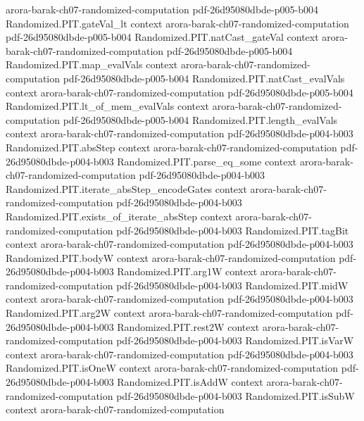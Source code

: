 \begin{theorem}
  {arora-barak-ch07-randomized-computation}
  {pdf-26d95080dbde-p005-b004}
\proofstep
  {Randomized.PIT.gateVal_lt}
  {context}
  {arora-barak-ch07-randomized-computation}
  {pdf-26d95080dbde-p005-b004}
\proofstep
  {Randomized.PIT.natCast_gateVal}
  {context}
  {arora-barak-ch07-randomized-computation}
  {pdf-26d95080dbde-p005-b004}
\proofstep
  {Randomized.PIT.map_evalVals}
  {context}
  {arora-barak-ch07-randomized-computation}
  {pdf-26d95080dbde-p005-b004}
\proofstep
  {Randomized.PIT.natCast_evalVals}
  {context}
  {arora-barak-ch07-randomized-computation}
  {pdf-26d95080dbde-p005-b004}
\proofstep
  {Randomized.PIT.lt_of_mem_evalVals}
  {context}
  {arora-barak-ch07-randomized-computation}
  {pdf-26d95080dbde-p005-b004}
\proofstep
  {Randomized.PIT.length_evalVals}
  {context}
  {arora-barak-ch07-randomized-computation}
  {pdf-26d95080dbde-p004-b003}
\proofstep
  {Randomized.PIT.absStep}
  {context}
  {arora-barak-ch07-randomized-computation}
  {pdf-26d95080dbde-p004-b003}
\proofstep
  {Randomized.PIT.parse_eq_some}
  {context}
  {arora-barak-ch07-randomized-computation}
  {pdf-26d95080dbde-p004-b003}
\proofstep
  {Randomized.PIT.iterate_absStep_encodeGates}
  {context}
  {arora-barak-ch07-randomized-computation}
  {pdf-26d95080dbde-p004-b003}
\proofstep
  {Randomized.PIT.exists_of_iterate_absStep}
  {context}
  {arora-barak-ch07-randomized-computation}
  {pdf-26d95080dbde-p004-b003}
\proofstep
  {Randomized.PIT.tagBit}
  {context}
  {arora-barak-ch07-randomized-computation}
  {pdf-26d95080dbde-p004-b003}
\proofstep
  {Randomized.PIT.bodyW}
  {context}
  {arora-barak-ch07-randomized-computation}
  {pdf-26d95080dbde-p004-b003}
\proofstep
  {Randomized.PIT.arg1W}
  {context}
  {arora-barak-ch07-randomized-computation}
  {pdf-26d95080dbde-p004-b003}
\proofstep
  {Randomized.PIT.midW}
  {context}
  {arora-barak-ch07-randomized-computation}
  {pdf-26d95080dbde-p004-b003}
\proofstep
  {Randomized.PIT.arg2W}
  {context}
  {arora-barak-ch07-randomized-computation}
  {pdf-26d95080dbde-p004-b003}
\proofstep
  {Randomized.PIT.rest2W}
  {context}
  {arora-barak-ch07-randomized-computation}
  {pdf-26d95080dbde-p004-b003}
\proofstep
  {Randomized.PIT.isVarW}
  {context}
  {arora-barak-ch07-randomized-computation}
  {pdf-26d95080dbde-p004-b003}
\proofstep
  {Randomized.PIT.isOneW}
  {context}
  {arora-barak-ch07-randomized-computation}
  {pdf-26d95080dbde-p004-b003}
\proofstep
  {Randomized.PIT.isAddW}
  {context}
  {arora-barak-ch07-randomized-computation}
  {pdf-26d95080dbde-p004-b003}
\proofstep
  {Randomized.PIT.isSubW}
  {context}
  {arora-barak-ch07-randomized-computation}

\end{theorem}
